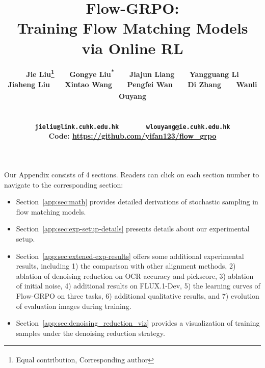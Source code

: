 \documentclass{article}
\title{Flow-GRPO: \\Training Flow Matching Models via Online RL}
\author{%
\bf
Jie Liu\affmark[1,3,5]\thanks{Equal contribution, \textsuperscript{\dag}Corresponding author}~~~ 
Gongye Liu\affmark[2,3]\textsuperscript{*}~~~ 
Jiajun Liang\affmark[3]~~~ 
Yangguang Li\affmark[1]\\
\bf
Jiaheng Liu\affmark[4]~~~ 
Xintao Wang\affmark[3]~~~ 
Pengfei Wan\affmark[3]~~~ 
Di Zhang\affmark[3]~~~ 
Wanli Ouyang\affmark[1,5]\textsuperscript{\dag}\\
\affaddr{\affmark[1]MMLab, CUHK~~~~~~~~~~}
\affaddr{\affmark[2]Tsinghua University~~~~~~~~~~}
\affaddr{\affmark[3]Kling Team, Kuaishou Technology~~~~~~~~~~} \\
\affaddr{\affmark[4]Nanjing University~~~~~~~~~~} 
\affaddr{\affmark[5]Shanghai AI Laboratory} \\
\small
\texttt{jieliu@link.cuhk.edu.hk}~~~~~~  
\texttt{wlouyang@ie.cuhk.edu.hk}\\
Code: \url{https://github.com/yifan123/flow_grpo}
}
\begin{document}


\maketitle










\clearpage
\appendix
\appendixtitle


\startcontents[app]





\vspace{1em}

\noindent Our Appendix consists of 4 sections. Readers can click on each section number to navigate to the corresponding section:
\vspace{-0.6em}
\begin{itemize}[leftmargin=2.0em]
    \item Section~\ref{app:sec:math} provides detailed derivations of stochastic sampling in flow matching models.
    \item Section~\ref{app:sec:exp-setup-details} presents details about our experimental setup.
    \item Section~\ref{app:sec:extened-exp-results} offers some additional experimental results, including 1) the comparison with other alignment methods, 2) ablation of denoising reduction on OCR accuracy and pickscore, 3) ablation of initial noise, 4) additional results on FLUX.1-Dev, 5) the learning curves of Flow-GRPO on three tasks, 6) additional qualitative results, and 7) evolution of evaluation images during training.
    \item Section~\ref{app:sec:denoising_reduction_viz} provides a visualization of training samples under the denoising reduction strategy.
    
\end{itemize}
\vspace{-0.4em}
\end{document}

